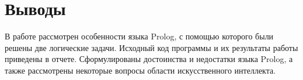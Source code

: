 \section{Выводы}

В работе рассмотрен особенности языка Prolog, с помощью которого были решены две логические задачи. Исходный код программы и их результаты работы приведены в отчете. Сформулированы достоинства и недостатки языка Prolog, а также рассмотрены некоторые вопросы области искусственного интеллекта.







